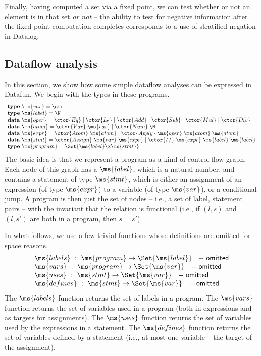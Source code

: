 Finally, having computed a set via a fixed point, we can test whether
or not an element is in that set \emph{or not} -- the ability to test
for negative information after the fixed point computation completes
corresponds to a use of stratified negation in Datalog.


\subsection{Dataflow analysis}
In this section, we show how some simple dataflow analyses can be expressed in
Datafun. We begin with the types in these programs.
\[\begin{array}{l}
\textbf{type}~\ms{var} = \str\\
\textbf{type}~\ms{label} = \N\\
\textbf{data}~\ms{oper} = \ctor{Eq} \pipe \ctor{Le}
\pipe \ctor{Add} \pipe \ctor{Sub} \pipe\ctor{Mul}\pipe\ctor{Div}\\
\textbf{data}~\ms{atom} = \ctor{Var}\;\ms{var} \pipe \ctor{Num}\;\N\\
\textbf{data}~\ms{expr} = \ctor{Atom}\;\ms{atom}
\pipe \ctor{Apply}\;\ms{oper}\;\ms{atom}\;\ms{atom}\\
\textbf{data}~\ms{stmt} =
\ctor{Assign} \;\ms{var} \;\ms{expr}
\pipe \ctor{If} \;\ms{expr} \;\ms{label}\;\ms{label} \\
\textbf{type}~\ms{program} = \Set{\ms{label} \x \ms{stmt}}

\end{array}\]
The basic idea is that we represent a program as a kind of control
flow graph. Each node of this graph has a $\ms{label}$, which is a
natural number, and contains a statement of type $\ms{stmt}$, which is
either an assignment of an expression (of type $\ms{expr}$) to a
variable (of type $\ms{var}$), or a conditional jump.  A program is
then just the set of nodes -- i.e., a set of label, statement pairs --
with the invariant that the relation is functional (i.e., if $(l, s)$
and $(l,s')$ are both in a program, then $s = s'$).

In what follows, we use a few trivial functions whose definitions are omitted
for space reasons.
\[\begin{array}{l}
\ms{labels} ~:~ \ms{program} \uto \Set{\ms{label}}\quad\textsf{-{}- omitted}\\
\ms{vars} ~:~ \ms{program} \uto \Set{\ms{var}} \quad\textsf{-{}- omitted}\\
\ms{uses} ~:~ \ms{stmt} \uto \Set{\ms{var}} \quad\textsf{-{}- omitted}\\
\ms{defines} ~:~ \ms{stmt} \uto \Set{\ms{var}} \quad\textsf{-{}- omitted}
\end{array}
\]
The $\ms{labels}$ function returns the set of labels in a program. The
$\ms{vars}$ function returns the set of variables used in a program (both in
expressions and as targets for assignments). The $\ms{uses}$ function
returns the set of variables used by the expressions in a statement. The
$\ms{defines}$ function returns the set of variables defined by a statement
(i.e., at most one variable -- the target of the assignment).

